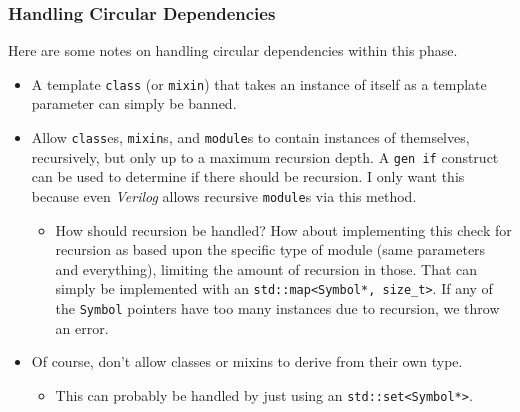 \documentclass{article}
\begin{document}
		\subsubsection{Handling Circular Dependencies}
		Here are some notes on handling circular dependencies within this
		phase.
		\begin{itemize}
		\item A template \texttt{class} (or \texttt{mixin}) that takes
			an instance of itself as a template parameter can simply be
			banned.
		\item Allow \texttt{class}es, \texttt{mixin}s, and
			\texttt{module}s to contain instances of themselves,
			recursively, but only up to a maximum recursion depth.  A
			\texttt{gen if} construct can be used to determine
			if there should be recursion.  I only want this because even
			\textit{Verilog} allows recursive \texttt{module}s via this
			method.
			\begin{itemize}
			\item How should recursion be handled?  How about implementing
				this check for recursion as based upon the specific type of
				module (same parameters and everything), limiting the
				amount of recursion in those.  That can simply be
				implemented with an \texttt{std::map<Symbol*, size\_t>}.
				If any of the \texttt{Symbol} pointers have too many
				instances due to recursion, we throw an error.
			\end{itemize}
		\item Of course, don't allow classes or mixins to derive from their
			own type.
			\begin{itemize}
			\item This can probably be handled by just using an
				\texttt{std::set<Symbol*>}.
			\end{itemize}
		\end{itemize}




\end{document}
